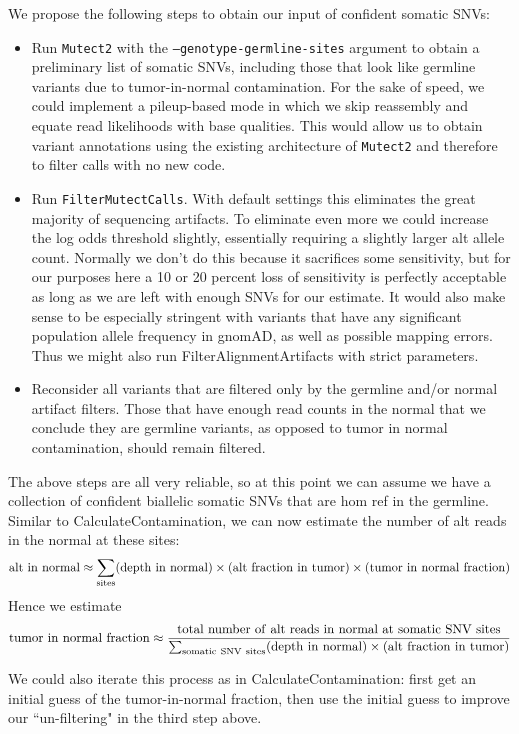 \documentclass[nofootinbib,amssymb,amsmath]{revtex4}
\newcommand{\code}[1]{\texttt{#1}}
\begin{document}
We propose the following steps to obtain our input of confident somatic SNVs:
\begin{itemize}
\item Run \code{Mutect2} with the \code{--genotype-germline-sites} argument to obtain a preliminary list of somatic SNVs, including those that look like germline variants due to tumor-in-normal contamination.  For the sake of speed, we could implement a pileup-based mode in which we skip reassembly and equate read likelihoods with base qualities.  This would allow us to obtain variant annotations using the existing architecture of \code{Mutect2} and therefore to filter calls with no new code.  
\item Run \code{FilterMutectCalls}.  With default settings this eliminates the great majority of sequencing artifacts.  To eliminate even more we could increase the log odds threshold slightly, essentially requiring a slightly larger alt allele count.  Normally we don't do this because it sacrifices some sensitivity, but for our purposes here a 10 or 20 percent loss of sensitivity is perfectly acceptable as long as we are left with enough SNVs for our estimate.  It would also make sense to be especially stringent with variants that have any significant population allele frequency in gnomAD, as well as possible mapping errors.  Thus we might also run FilterAlignmentArtifacts with strict parameters.
\item Reconsider all variants that are filtered only by the germline and/or normal artifact filters.  Those that have enough read counts in the normal that we conclude they are germline variants, as opposed to tumor in normal contamination, should remain filtered.  
\end{itemize}

The above steps are all very reliable, so at this point we can assume we have a collection of confident biallelic somatic SNVs that are hom ref in the germline.  Similar to CalculateContamination, we can now estimate the number of alt reads in the normal at these sites:
\begin{align}
{\rm alt~in~normal} \approx \sum_{\rm sites} ({\rm depth~in~normal}) \times ({\rm alt~fraction~in~tumor}) \times ({\rm tumor~in~normal~fraction})
\end{align}
Hence we estimate
\begin{align}
{\rm tumor~in~normal~fraction} \approx 
\frac{\rm total~number~of~alt~reads~in~normal~at~somatic~SNV~sites}
{\sum_{\rm somatic~SNV~sites} ({\rm depth~in~normal}) \times ({\rm alt~fraction~in~tumor})}
\end{align}

We could also iterate this process as in CalculateContamination: first get an initial guess of the tumor-in-normal fraction, then use the initial guess to improve our ``un-filtering" in the third step above.
\end{document}
